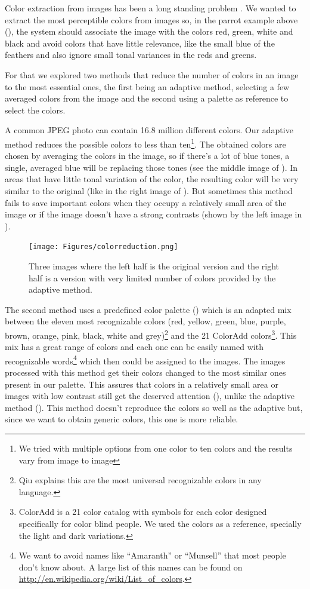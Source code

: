 Color extraction from images has been a long standing problem . We wanted to extract the most perceptible colors from images so, in the parrot example above (), the system should associate the image with the colors red, green, white and black and avoid colors that have little relevance, like the small blue of  the feathers and also ignore small tonal variances in the reds and greens.

For that we explored two methods that reduce the number of colors in an image to the most essential ones, the first being an adaptive method, selecting a few averaged colors from the image and the second using a palette as reference to select the colors.

A common JPEG photo can contain 16.8 million different colors. Our adaptive method reduces the possible colors to less than ten\footnote{We tried with multiple options from one color to ten colors and the results vary from image to image}. The obtained colors are chosen by averaging the colors in the image, so if there's a lot of blue tones, a single, averaged blue will be replacing those tones (see the middle image of ). In areas that have little tonal variation of the color, the resulting color will be very similar to the original (like in the right image of ). But sometimes this method fails to save important colors when they occupy a relatively small area of the image or if the image doesn't have a strong contrasts (shown by the left image in ).

\begin{figure}[ht]
	\centering
		\texttt{[image: Figures/colorreduction.png]}
	\caption{Three images where the left half is the original version and the right half is a version with very limited number of colors provided by the adaptive method.}
	\label{fig:sky}
\end{figure}




The second method uses a predefined color palette () which is an adapted mix between the eleven most recognizable colors (red, yellow, green, blue, purple, brown, orange, pink, black, white and grey)\footnote{Qiu \cite{Qiu:2007p1207} explains this are the most universal recognizable colors in any language.} and the 21 ColorAdd colors\footnote{ColorAdd is a 21 color catalog with symbols for each color designed specifically for color blind people. We used the colors as a reference, specially the light and dark variations.}. This mix has a great range of colors and each one can be easily named with recognizable words\footnote{We want to avoid names like ``Amaranth'' or ``Munsell'' that most people don't know about. A large list of this names can be found on \url{http://en.wikipedia.org/wiki/List_of_colors}.} which then could be assigned to the images. The images processed with this method get their colors changed to the most similar ones present in our palette. This assures that colors in a relatively small area or images with low contrast still get the deserved attention (), unlike the adaptive method (). This method doesn't reproduce the colors so well as the adaptive but, since we want to obtain generic colors, this one is more reliable.


